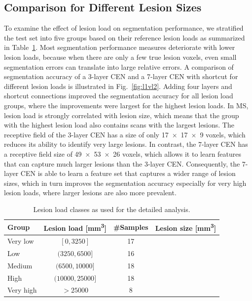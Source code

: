 \subsection{Comparison for Different Lesion Sizes}



To examine the effect of lesion load on segmentation performance, we stratified
the test set into five groups based on their reference lesion loads as
summarized in Table~\ref{tab:groups}. Most segmentation performance measures
deteriorate with lower lesion loads, because when there are only a few true
lesion voxels, even small segmentation errors can translate into large relative
errors. A comparison of segmentation accuracy of a 3-layer CEN and a 7-layer CEN
with shortcut for different lesion loads is illustrated in Fig.~\ref{fig:l1vl2}.
Adding four layers and shortcut connections improved the segmentation accuracy
for all lesion load groups, where the improvements were largest for the highest
lesion loads. In MS, lesion load is strongly correlated with lesion size, which
means that the group with the highest lesion load also contains scans with the
largest lesions. The receptive field of the 3-layer CEN has a size of only
\num{17x17x9} voxels, which reduces its ability to identify very large lesions.
In contrast, the 7-layer CEN has a receptive field size of \num{49x53x26}
voxels, which allows it to learn features that can capture much larger lesions
than the 3-layer CEN. Consequently, the 7-layer CEN is able to learn a feature
set that captures a wider range of lesion sizes, which in turn improves the
segmentation accuracy especially for very high lesion loads, where larger
lesions are also more prevalent.

\begin{table}[tb]
\caption{Lesion load classes as used for the detailed analysis.}
\label{tab:groups}
\centering
\begin{tabular}{@{}lccc@{}}
\toprule
Group & Lesion load [\si{\cubic\milli\metre}] & \#Samples & Lesion size
[\si{\cubic\milli\metre}]\\
\midrule
Very low & $[0,3250]$ & 17 \\
Low      & $(3250,6500]$ & 16 \\
Medium & $(6500,10000]$ & 18 \\
High & $(10000,25000]$ & 18 \\
Very high & $> 25000$ & 8 \\
\bottomrule
\end{tabular}
\end{table}

